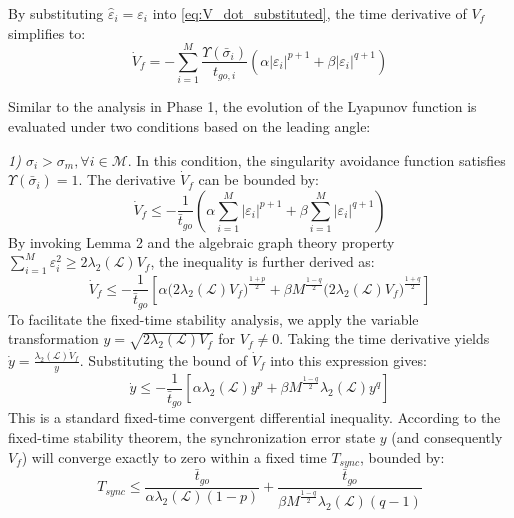 \documentclass[lettersize,journal]{IEEEtran}
\begin{document}
By substituting $\hat{\varepsilon}_i = \varepsilon_i$ into \eqref{eq:V_dot_substituted}, the time derivative of $V_f$ simplifies to:
\begin{equation}
	\dot{V}_f = - \sum_{i=1}^{M} \frac{\Upsilon(\bar{\sigma}_i)}{t_{go,i}} \left( \alpha |\varepsilon_i|^{p+1} + \beta |\varepsilon_i|^{q+1} \right)
\end{equation}

Similar to the analysis in Phase 1, the evolution of the Lyapunov function is evaluated under two conditions based on the leading angle:

\textit{1) ${\sigma}_i > {\sigma}_m, \forall i \in \mathcal{M}$}. In this condition, the singularity avoidance function satisfies $\Upsilon(\bar{\sigma}_i) = 1$. The derivative $\dot{V}_f$ can be bounded by:
\begin{equation}
	\dot{V}_f \leq -\frac{1}{\bar{t}_{go}} \left( \alpha \sum_{i=1}^{M} |\varepsilon_i|^{p+1} + \beta \sum_{i=1}^{M} |\varepsilon_i|^{q+1} \right)
\end{equation}
By invoking Lemma 2 and the algebraic graph theory property $\sum_{i=1}^{M} \varepsilon_i^2 \ge 2\lambda_2(\mathcal{L})V_f$, the inequality is further derived as:
\begin{equation}
	\dot{V}_f \leq -\frac{1}{\bar{t}_{go}} \left[ \alpha \bigl(2\lambda_2(\mathcal{L}) V_f\bigr)^{\frac{1+p}{2}} + \beta M^{\frac{1-q}{2}} \bigl(2\lambda_2(\mathcal{L}) V_f\bigr)^{\frac{1+q}{2}} \right]
\end{equation}
To facilitate the fixed-time stability analysis, we apply the variable transformation $y = \sqrt{2\lambda_2(\mathcal{L}) V_f}$ for $V_f \neq 0$. Taking the time derivative yields $\dot{y} = \frac{\lambda_2(\mathcal{L})\dot{V}_f}{y}$. Substituting the bound of $\dot{V}_f$ into this expression gives:
\begin{equation}
	\dot{y} \leq -\frac{1}{\bar{t}_{go}} \left[ \alpha \lambda_2(\mathcal{L}) y^p + \beta M^{\frac{1-q}{2}} \lambda_2(\mathcal{L}) y^q \right]
\end{equation}
This is a standard fixed-time convergent differential inequality. According to the fixed-time stability theorem, the synchronization error state $y$ (and consequently $V_f$) will converge exactly to zero within a fixed time $T_{sync}$, bounded by:
\begin{equation}
	T_{sync} \le \frac{\bar{t}_{go}}{\alpha \lambda_2(\mathcal{L})(1-p)} + \frac{\bar{t}_{go}}{\beta M^{\frac{1-q}{2}} \lambda_2(\mathcal{L})(q-1)}
\end{equation}
\end{document}
